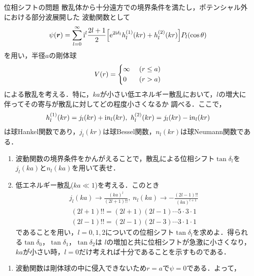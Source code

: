 \documentclass{report}
\begin{document}
  \begin{myex}{位相シフトの問題}{}
    散乱体から十分遠方での境界条件を満たし，ポテンシャル外における部分波展開した
    波動関数として
    \begin{align}
      \psi(\bm{r}) = \sum_{l=0}^{\infty} \mathrm{i}^l \frac{2l+1}{2}\qty[\mathrm{e}^{2\mathrm{i}\delta_l} h_l^{(1)} (kr) + h_l^{(2)} (kr)] P_l(\cos\theta)
    \end{align}
    を用い，半径$a$の剛体球
    \begin{align}
      V(r) = 
      \begin{dcases}
        \infty\ &(r\leq a)\\
        0\ &(r>a)
      \end{dcases}
    \end{align}
    による散乱を考える．特に，$ka$が小さい低エネルギー散乱において，$l$の増大に伴ってその寄与が散乱に対してどの程度小さくなるか
    調べる．ここで，
    \begin{align}
      h_l^{(1)}(kr) = j_l(kr) + \mathrm{i} n_l(kr),\ h_l^{(2)}(kr) = j_l(kr) - \mathrm{i} n_l(kr)
    \end{align}
    は球Hankel関数であり，$j_l(kr)$は球Bessel関数，$n_l(kr)$は球Neumann関数である．
    \begin{enumerate}
      \item 波動関数の境界条件をかんがえることで，散乱による位相シフト$\tan\delta_l$を$j_l(ka)$と$n_l(ka)$を用いて表せ．
      \item 低エネルギー散乱($ka \ll 1$)を考える．このとき
            \begin{align}
              \label{LimitOfBessel}
              j_l(ka) \to \frac{(ka)^l}{(2l+1)!!},\ n_l(ka) \to -\frac{(2l-1)!!}{(ka)^{l+1}}
            \end{align}
            \begin{align}
              (2l+1)!! = (2l+1)(2l-1)\cdots5\cdot3\cdot1\\
              (2l-1)!! = (2l-1)(2l-3)\cdots3\cdot1\cdot1
            \end{align}
            であることを用い，$l=0,1,2$についての位相シフト$\tan\delta_l$を求めよ．得られる$\tan\delta_0$，$\tan\delta_1$，$\tan\delta_2$は
            $l$の増加と共に位相シフトが急激に小さくなり，$ka$が小さい時，$l=0$だけ考えれば十分であることを示すものである．
    \end{enumerate}
    \tcblower
    \begin{enumerate}
      \item 波動関数は剛体球の中に侵入できないため$r=a$で$\psi=0$である．よって，

\end{enumerate}
\end{myex}
\end{document}
